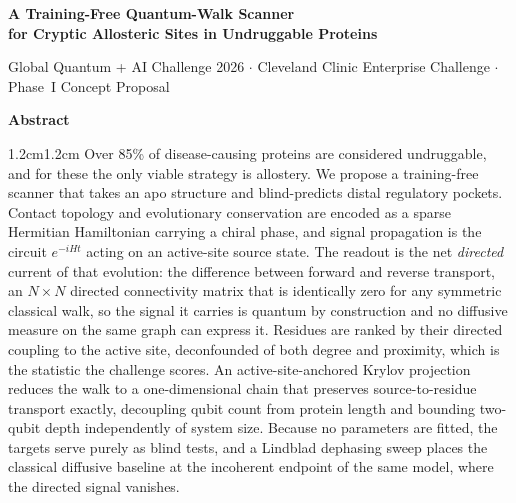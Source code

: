 \documentclass[10pt,a4paper]{article}
\begin{document}
\begin{center}
  {\LARGE\bfseries A Training-Free Quantum-Walk Scanner\\[0.25em]
   for Cryptic Allosteric Sites in Undruggable Proteins\par}
  \vspace{0.9em}
  {\small Global Quantum + AI Challenge 2026 $\cdot$ Cleveland Clinic Enterprise Challenge
   $\cdot$ Phase~I Concept Proposal\par}
\end{center}
\vspace{0.6em}

\begin{center}\textbf{Abstract}\end{center}
\begin{adjustwidth}{1.2cm}{1.2cm}
\small
Over 85\% of disease-causing proteins are considered undruggable, and for these the only viable
strategy is allostery. We propose a training-free scanner that takes an apo structure and
blind-predicts distal regulatory pockets. Contact topology and evolutionary conservation are encoded
as a sparse Hermitian Hamiltonian carrying a chiral phase, and signal propagation is the circuit
$e^{-iHt}$ acting on an active-site source state. The readout is the net \emph{directed} current of
that evolution: the difference between forward and reverse transport, an $N\times N$ directed
connectivity matrix that is identically zero for any symmetric classical walk, so the signal it
carries is quantum by construction and no diffusive measure on the same graph can express it.
Residues are ranked by their directed coupling to the active site, deconfounded of both degree and
proximity, which is the statistic the challenge scores. An active-site-anchored Krylov projection
reduces the walk to a one-dimensional chain that preserves source-to-residue transport exactly,
decoupling qubit count from protein length and bounding two-qubit depth independently of system
size. Because no parameters are fitted, the targets serve purely as blind tests, and a Lindblad
dephasing sweep places the classical diffusive baseline at the incoherent endpoint of the same
model, where the directed signal vanishes.
\end{adjustwidth}
\vspace{0.5em}

\end{document}
